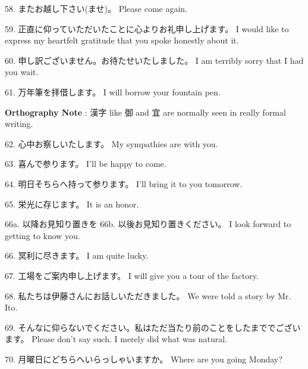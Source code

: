 \par{58. またお越し下さい(ませ)。 \hfill\break
Please come again. }

\par{59. 正直に仰っていただいたことに心よりお礼申し上げます。 \hfill\break
I would like to express my heartfelt gratitude that you spoke honestly about it. }

\par{60. 申し訳ございません。お待たせいたしました。 \hfill\break
I am terribly sorry that I had you wait. }

\par{61. 万年筆を拝借します。 \hfill\break
I will borrow your fountain pen. }

\par{\textbf{Orthography Note }: 漢字 like 御 and 宜 are normally seen in really formal writing. }
 
\par{62. 心中お察しいたします。 \hfill\break
My sympathies are with you. }

\par{63. 喜んで参ります。 \hfill\break
I'll be happy to come. }
 
\par{64. 明日そちらへ持って参ります。 \hfill\break
I'll bring it to you tomorrow. }
 
\par{65. 栄光に存じます。 \hfill\break
It is an honor. }
 
\par{66a. 以降お見知り置きを \hfill\break
66b. 以後お見知り置きください。 \hfill\break
I look forward to getting to know you. }
 
\par{66. 冥利に尽きます。 \hfill\break
I am quite lucky.  }
 
\par{67. 工場をご案内申し上げます。 \hfill\break
I will give you a tour of the factory. }

\par{68. 私たちは伊藤さんにお話しいただきました。 \hfill\break
We were told a story by Mr. Ito. }
 
\par{69. そんなに仰らないでください。私はただ当たり前のことをしたまででございます。 \hfill\break
Please don't say such. I merely did what was natural. }

\par{70. 月曜日にどちらへいらっしゃいますか。 \hfill\break
Where are you going Monday? }
 
